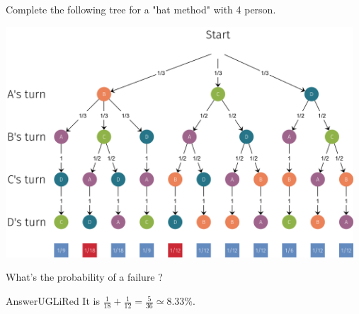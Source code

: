 \documentclass[12pt,a4paper,article,english,firamath]{nsi}
\begin{document}
Complete the following tree for a "hat method" with 4 person.
\begin{center}
    \includegraphics[width=13cm]{img/tree_santa4_sol.png}
\end{center}
What's the probability of a failure ?
\begin{encadrecolore}{Answer}{UGLiRed}
    It is $\frac{1}{18}+\frac{1}{12}=\frac{5}{36}\simeq 8.33\%$.
\end{encadrecolore}
\end{document}
